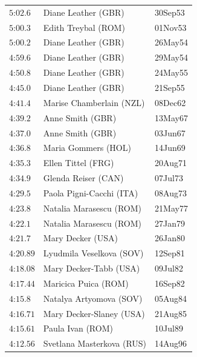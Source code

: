 \begin{figure}
{{\begin{tabular}[t]{|l|ll|}
           $\text{5:02}.6$    &Diane Leather (GBR)         &30Sep53 \\
           $\text{5:00}.3$    &Edith Treybal (ROM)         &01Nov53 \\
           $\text{5:00}.2$    &Diane Leather (GBR)         &26May54 \\
           $\text{4:59}.6$    &Diane Leather (GBR)         &29May54 \\
           $\text{4:50}.8$    &Diane Leather (GBR)         &24May55 \\
           $\text{4:45}.0$    &Diane Leather (GBR)         &21Sep55 \\
           $\text{4:41}.4$    &Marise Chamberlain (NZL)    &08Dec62 \\
           $\text{4:39}.2$    &Anne Smith (GBR)            &13May67 \\
           $\text{4:37}.0$    &Anne Smith (GBR)            &03Jun67 \\
           $\text{4:36}.8$    &Maria Gommers (HOL)         &14Jun69 \\
           $\text{4:35}.3$    &Ellen Tittel (FRG)          &20Aug71 \\
           $\text{4:34}.9$    &Glenda Reiser (CAN)         &07Jul73 \\
           $\text{4:29}.5$    &Paola Pigni-Cacchi (ITA)    &08Aug73 \\
           $\text{4:23}.8$    &Natalia Marasescu (ROM)     &21May77 \\
           $\text{4:22}.1$    &Natalia Marasescu (ROM)     &27Jan79 \\
           $\text{4:21}.7$    &Mary Decker (USA)           &26Jan80 \\
           $\text{4:20}.89$   &Lyudmila Veselkova (SOV)    &12Sep81 \\
           $\text{4:18}.08$   &Mary Decker-Tabb (USA)      &09Jul82 \\
           $\text{4:17}.44$   &Maricica Puica (ROM)        &16Sep82 \\
           $\text{4:15}.8$    &Natalya Artyomova (SOV)     &05Aug84 \\
           $\text{4:16}.71$   &Mary Decker-Slaney (USA)    &21Aug85 \\
           $\text{4:15}.61$   &Paula Ivan (ROM)            &10Jul89 \\
           $\text{4:12}.56$   &Svetlana Masterkova (RUS)   &14Aug96 \\
       \hline
       \end{tabular}
      }}  %
    \end{figure}
  

